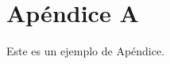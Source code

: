 \chapter{Apéndice A}
\label{appendix:appendixA}
\parindent=16mm    

Este es un ejemplo de Apéndice.
